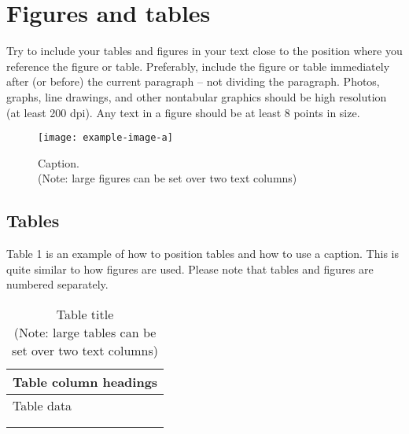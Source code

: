 \documentclass{paper}
\begin{document}
\section{Figures and tables}

Try to include your tables and figures in your text close to the position where you reference the figure or table.
Preferably, include the figure or table immediately after (or before) the current paragraph – not dividing the paragraph.
Photos, graphs, line drawings, and other nontabular graphics should be high resolution (at least 200 dpi).
Any text in a figure should be at least 8 points in size.

\begin{figure}[H]
    \centering
    \texttt{[image: example-image-a]}
    \caption{Caption.\\(Note: large figures can be set over two text columns)}
\end{figure}

\subsection{Tables}

Table 1 is an example of how to position tables and how to use a caption.
This is quite similar to how figures are used.
Please note that tables and figures are numbered separately.

\begin{table}[H]
    \centering
    \begin{tabular}{|p{\columnwidth}|}
        \hline
        Table column headings\\
        \hline
        Table data\\\\\\
        \hline
    \end{tabular}
    \caption{Table title\\(Note: large tables can be set over two text columns)}
\end{table}

\cite{watanabe2019simd}
\end{document}
